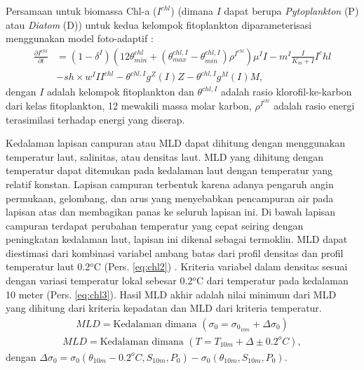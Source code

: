 \begin{spacing}{1.5}
	Persamaan untuk biomassa Chl-a ($I^{chl}$) (dimana $I$ dapat berupa \textit{Pytoplankton} (P) atau \textit{Diatom} (D)) untuk kedua kelompok fitoplankton diparameterisasi menggunakan model foto-adaptif :
	\begin{equation}\label{eq:chl1}
		\begin{aligned}
			\frac{\partial I^{chl}}{\partial t} &= (1-\delta ^I)(12\theta^{chl}_{min}+(\theta^{chl,I}_{max}-\theta^{chl,I}_{min})\rho^{I^{chl}})\mu^I I-m^I \frac{I}{K_m +I}I^chl \\
			&- sh \times w^I II^{chl}-\theta^{chl,I}g^Z(I)Z-\theta^{chl,I}g^M(I)M,
		\end{aligned}
	\end{equation}
	dengan $I$ adalah kelompok fitoplankton dan $\theta^{chl,I}$ adalah rasio klorofil-ke-karbon dari kelas fitoplankton, 12 mewakili massa molar karbon, $\rho^{I^{chl}}$ adalah rasio energi terasimilasi terhadap energi yang diserap.
	
	Kedalaman lapisan campuran atau MLD dapat dihitung dengan menggunakan temperatur laut, salinitas, atau densitas laut. MLD yang dihitung dengan temperatur dapat ditemukan pada kedalaman laut dengan temperatur yang relatif konstan. Lapisan campuran terbentuk karena adanya pengaruh angin permukaan, gelombang, dan arus yang menyebabkan pencampuran air pada lapisan atas dan membagikan panas ke seluruh lapisan ini. Di bawah lapisan campuran terdapat perubahan temperatur yang cepat seiring dengan peningkatan kedalaman laut, lapisan ini dikenal sebagai termoklin. MLD dapat diestimasi dari kombinasi variabel ambang batas dari profil densitas dan profil temperatur laut 0.2$^o$C (Pers. \ref{eq:chl2}) \cite{Boyer2004}. 
	Kriteria variabel dalam densitas sesuai dengan variasi temperatur lokal sebesar 0.2$^o$C dari temperatur pada kedalaman 10 meter (Pers. \ref{eq:chl3}). Hasil MLD akhir adalah nilai minimum dari MLD yang dihitung dari kriteria kepadatan dan MLD dari kriteria temperatur. 
	\begin{equation}\label{eq:chl2}
		\begin{aligned}
			MLD= \text{Kedalaman dimana }(\sigma_0=\sigma_{0_{10m}}+\Delta \sigma_0)
		\end{aligned}
	\end{equation}
	\begin{equation}\label{eq:chl3}
		\begin{aligned}
			MLD= \text{Kedalaman dimana }(T=T_{10m}+\Delta \pm 0.2^oC),
		\end{aligned}
	\end{equation}
	dengan $\Delta \sigma_0=\sigma_0(\theta_{10m}-0.2^oC,S_{10m},P_0)-\sigma_0(\theta_{10m},S_{10m},P_0)$.

\end{spacing}
